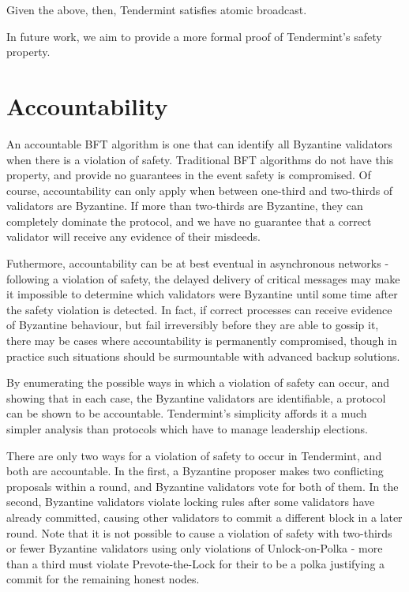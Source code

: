 Given the above, then, Tendermint satisfies atomic broadcast.

In future work, we aim to provide a more formal proof of Tendermint's safety property.

%
%
%


\section{Accountability}

An accountable BFT algorithm is one that can identify all Byzantine validators 
when there is a violation of safety. 
Traditional BFT algorithms do not have this property,
and provide no guarantees in the event safety is compromised.
Of course, accountability can only apply when between one-third and two-thirds of
validators are Byzantine.
If more than two-thirds are Byzantine, they can completely dominate the protocol,
and we have no guarantee that a correct validator will receive any evidence of their misdeeds.

Futhermore, accountability can be at best eventual in asynchronous networks - 
following a violation of safety, the delayed delivery of critical messages
may make it impossible to determine which validators were Byzantine until some time after
the safety violation is detected. 
In fact, if correct processes can receive evidence of Byzantine behaviour, 
but fail irreversibly before they are able to gossip it, 
there may be cases where accountability is permanently compromised,
though in practice such situations should be surmountable
with advanced backup solutions.

By enumerating the possible ways in which a violation of safety can occur,
and showing that in each case, the Byzantine validators are identifiable,
a protocol can be shown to be accountable.
Tendermint's simplicity affords it a much simpler analysis than protocols 
which have to manage leadership elections.

There are only two ways for a violation of safety to occur in Tendermint,
and both are accountable.
In the first, a Byzantine proposer makes two conflicting proposals within a round,
and Byzantine validators vote for both of them.
In the second, Byzantine validators violate locking rules after some validators have already committed,
causing other validators to commit a different block in a later round.
Note that it is not possible to cause a violation of safety with two-thirds or fewer
Byzantine validators using only violations of Unlock-on-Polka - 
more than a third must violate Prevote-the-Lock for their to be a polka justifying a commit 
for the remaining honest nodes.

